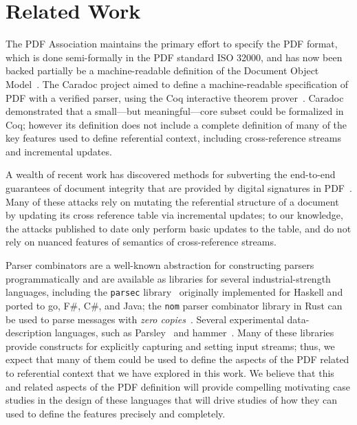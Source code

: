 \section{Related Work}
\label{sec:rel-work}


The PDF Association maintains the primary effort to specify the PDF
format, which is done semi-formally in the PDF standard ISO 32000, and has now
been backed partially be a machine-readable definition of the Document
Object Model~\cite{wyatt2021work}.
%
The Caradoc project aimed to define a machine-readable specification
of PDF with a verified parser, using the Coq interactive theorem
prover~\cite{g.endignouxCaradocPragmaticApproach2016}.
%
Caradoc demonstrated that a small---but meaningful---core subset could
be formalized in Coq;
%
however its definition does not include a complete definition of many
of the key features used to define referential context, including
cross-reference streams and incremental updates.

%
A wealth of recent work has discovered methods for subverting the end-to-end
guarantees of document integrity that are provided by digital
signatures in
PDF~\cite{mullerPracticalDecryptionExFiltration2019,mladenovTrillionDollarRefund2019,mullerProcessingDangerousPaths2021,ndsssymposiumNDSS2021Shadow2021,rohlmannBreakingSpecificationPDF2021}.
%
Many of these attacks rely on mutating the referential structure of a
document by updating its cross reference table via incremental
updates;
%
to our knowledge, the attacks published to date only perform basic
updates to the table, and do not rely on nuanced features of semantics
of cross-reference streams.

Parser combinators are a well-known abstraction for constructing
parsers programmatically and are available as libraries for several
industrial-strength languages, including the \texttt{parsec}
library~\cite{leijen2001parsec} originally implemented for Haskell and
ported to go, F\#, C\#, and Java;
%
the \texttt{nom} parser combinator library in Rust can be used to
parse messages with \emph{zero copies}~\cite{couprie2015nom}.
%
Several experimental data-description languages, such as
Parsley~\cite{mundkurResearchReportParsley2020} and
hammer~\cite{bratus2017curing}.
%
Many of these libraries provide constructs for explicitly capturing
and setting input streams;
%
thus, we expect that many of them could be used to define the aspects
of the PDF related to referential context that we have explored in
this work.
%
We believe that this and related aspects of the PDF definition will
provide compelling motivating case studies in the design of these
languages that will drive studies of how they can used to define the
features precisely and completely.
